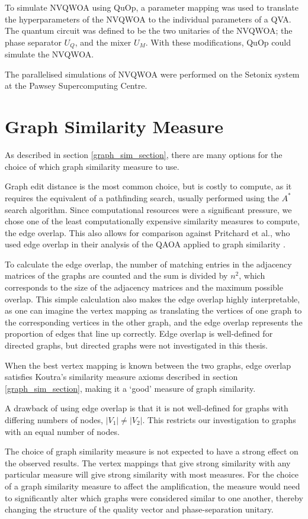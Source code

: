 To simulate NVQWOA using QuOp, a parameter mapping was used to translate the hyperparameters of the NVQWOA to the individual parameters of a QVA. The quantum circuit was defined to be the two unitaries of the NVQWOA; the phase separator $U_Q$, and the mixer $U_M$. With these modifications, QuOp could simulate the NVQWOA.

The parallelised simulations of NVQWOA were performed on the Setonix system at the Pawsey Supercomputing Centre.

\section{Graph Similarity Measure}
As described in section \ref{graph_sim_section}, there are many options for the choice of which graph similarity measure to use.

Graph edit distance is the most common choice, but is costly to compute, as it requires the equivalent of a pathfinding search, usually performed using the $A^*$ search algorithm.
Since computational resources were a significant pressure, we chose one of the least computationally expensive similarity measures to compute, the edge overlap. This also allows for comparison against Pritchard et al., who used edge overlap in their analysis of the QAOA applied to graph similarity \cite{QAOA_graph_sim}.

To calculate the edge overlap, the number of matching entries in the adjacency matrices of the graphs are counted and the sum is divided by $n^2$, which corresponds to the size of the adjacency matrices and the maximum possible overlap. This simple calculation also makes the edge overlap highly interpretable, as one can imagine the vertex mapping as translating the vertices of one graph to the corresponding vertices in the other graph, and the edge overlap represents the proportion of edges that line up correctly. Edge overlap is well-defined for directed graphs, but directed graphs were not investigated in this thesis.

When the best vertex mapping is known between the two graphs, edge overlap satisfies Koutra's similarity measure axioms described in section \ref{graph_sim_section}, making it a `good' measure of graph similarity.

A drawback of using edge overlap is that it is not well-defined for graphs with differing numbers of nodes, $|V_1|\neq|V_2|$. This restricts our investigation to graphs with an equal number of nodes.

The choice of graph similarity measure is not expected to have a strong effect on the observed results. The vertex mappings that give strong similarity with any particular measure will give strong similarity with most measures. For the choice of a graph similarity measure to affect the amplification, the measure would need to significantly alter which graphs were considered similar to one another, thereby changing the structure of the quality vector and phase-separation unitary.

